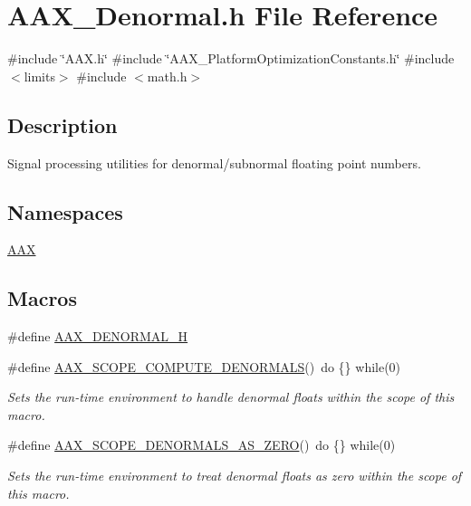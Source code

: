 \hypertarget{a00755}{}\section{A\+A\+X\+\_\+\+Denormal.\+h File Reference}
\label{a00755}
{\ttfamily \#include \char`\"{}A\+A\+X.\+h\char`\"{}}\newline
{\ttfamily \#include \char`\"{}A\+A\+X\+\_\+\+Platform\+Optimization\+Constants.\+h\char`\"{}}\newline
{\ttfamily \#include $<$limits$>$}\newline
{\ttfamily \#include $<$math.\+h$>$}\newline


\subsection{Description}
Signal processing utilities for denormal/subnormal floating point numbers. 

\subsection*{Namespaces}
\begin{DoxyCompactItemize}
\item 
 \mbox{\hyperlink{a00852}{A\+AX}}
\end{DoxyCompactItemize}
\subsection*{Macros}
\begin{DoxyCompactItemize}
\item 
\#define \mbox{\hyperlink{a00755_aebb709c3232ca8ebe6ea366ca8391dad}{A\+A\+X\+\_\+\+D\+E\+N\+O\+R\+M\+A\+L\+\_\+H}}
\item 
\#define \mbox{\hyperlink{a00755_ad45309abfd0e2faa7a28c9ed753f7806}{A\+A\+X\+\_\+\+S\+C\+O\+P\+E\+\_\+\+C\+O\+M\+P\+U\+T\+E\+\_\+\+D\+E\+N\+O\+R\+M\+A\+LS}}()~do \{\} while(0)
\begin{DoxyCompactList}\small\item\em Sets the run-\/time environment to handle denormal floats within the scope of this macro. \end{DoxyCompactList}\item 
\#define \mbox{\hyperlink{a00755_aeb63901cb0661447fb69b6d10f5f1cba}{A\+A\+X\+\_\+\+S\+C\+O\+P\+E\+\_\+\+D\+E\+N\+O\+R\+M\+A\+L\+S\+\_\+\+A\+S\+\_\+\+Z\+E\+RO}}()~do \{\} while(0)
\begin{DoxyCompactList}\small\item\em Sets the run-\/time environment to treat denormal floats as zero within the scope of this macro. \end{DoxyCompactList}\end{DoxyCompactItemize}
